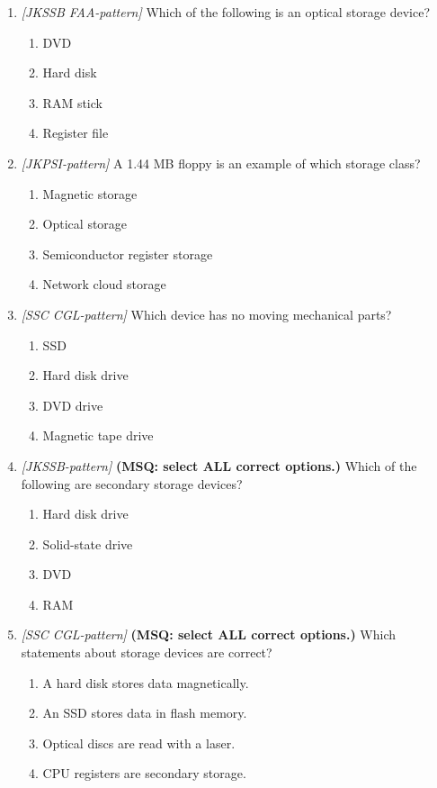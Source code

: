 \begin{enumerate}[label=\textbf{Q\arabic*.}, leftmargin=*]
\item \textit{[JKSSB FAA-pattern]} Which of the following is an optical storage device?
  \begin{enumerate}[label=\Alph*.]
    \item DVD
    \item Hard disk
    \item RAM stick
    \item Register file
  \end{enumerate}
\item \textit{[JKPSI-pattern]} A 1.44 MB floppy is an example of which storage class?
  \begin{enumerate}[label=\Alph*.]
    \item Magnetic storage
    \item Optical storage
    \item Semiconductor register storage
    \item Network cloud storage
  \end{enumerate}
\item \textit{[SSC CGL-pattern]} Which device has no moving mechanical parts?
  \begin{enumerate}[label=\Alph*.]
    \item SSD
    \item Hard disk drive
    \item DVD drive
    \item Magnetic tape drive
  \end{enumerate}
\item \textit{[JKSSB-pattern]} \textbf{(MSQ: select ALL correct options.)} Which of the following are secondary storage devices?
  \begin{enumerate}[label=\Alph*.]
    \item Hard disk drive
    \item Solid-state drive
    \item DVD
    \item RAM
  \end{enumerate}
\item \textit{[SSC CGL-pattern]} \textbf{(MSQ: select ALL correct options.)} Which statements about storage devices are correct?
  \begin{enumerate}[label=\Alph*.]
    \item A hard disk stores data magnetically.
    \item An SSD stores data in flash memory.
    \item Optical discs are read with a laser.
    \item CPU registers are secondary storage.

\end{enumerate}
\end{enumerate}

